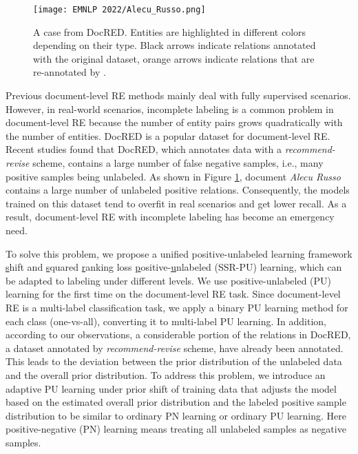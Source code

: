 \documentclass[11pt]{article}
\begin{document}
\begin{figure}
\centering
\texttt{[image: EMNLP 2022/Alecu\_Russo.png]} 
\caption{A case from DocRED. Entities are highlighted in different colors depending on their type. Black arrows indicate relations annotated with the original dataset, orange arrows indicate relations that are re-annotated by \citep{tan2022revisiting}.}
\label{fig1}
\end{figure}

Previous document-level RE methods mainly deal with fully supervised scenarios. However, in real-world scenarios, incomplete labeling is a common problem in document-level RE because the number of entity pairs grows quadratically with the number of entities. DocRED \citep{yao-etal-2019-docred} is a popular dataset for document-level RE. Recent studies \citep{huang-etal-2022-recommend, tan2022revisiting} found that DocRED, which annotates data with a \emph{recommend-revise} scheme, contains a large number of false negative samples, i.e., many positive samples being unlabeled. As shown in Figure \ref{fig1}, document \emph{Alecu Russo} contains a large number of unlabeled positive relations. Consequently, the models trained on this dataset tend to overfit in real scenarios and get lower recall. As a result, document-level RE with incomplete labeling has become an emergency need. 

To solve this problem, we propose a unified positive-unlabeled learning framework  \underline{s}hift and \underline{s}quared \underline{r}anking loss \underline{p}ositive-\underline{u}nlabeled (SSR-PU) learning, which can be adapted to labeling under different levels. We use positive-unlabeled (PU) learning for the first time on the document-level RE task. Since document-level RE is a multi-label classification task, we apply a binary PU learning method for each class (one-vs-all), converting it to multi-label PU learning. In addition, according to our observations, a considerable portion of the relations in DocRED, a dataset annotated by \emph{recommend-revise} scheme, have already been annotated. This leads to the deviation between the prior distribution of the unlabeled data and the overall prior distribution. To address this problem, we introduce an adaptive PU learning under prior shift of training data that adjusts the model based on the estimated overall prior distribution and the labeled positive sample distribution to be similar to ordinary PN learning or ordinary PU learning. Here positive-negative (PN) learning means treating all unlabeled samples as negative samples.
\end{document}
